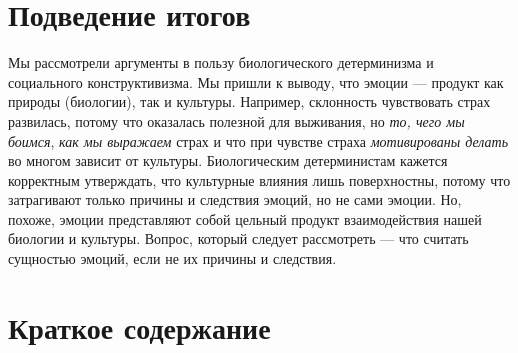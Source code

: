 \documentclass[11pt]{book}
\begin{document}
\section{Подведение итогов}

Мы рассмотрели аргументы в пользу биологического детерминизма и социального конструктивизма. Мы пришли к выводу, что эмоции --- продукт как природы (биологии), так и культуры. Например, склонность чувствовать страх развилась, потому что оказалась полезной для выживания, но \textit{то, чего мы боимся}, \textit{как мы выражаем} страх и что при чувстве страха \textit{мотивированы делать} во многом зависит от культуры. Биологическим детерминистам кажется корректным утверждать, что культурные влияния лишь поверхностны, потому что затрагивают только причины и следствия эмоций, но не сами эмоции. Но, похоже, эмоции представляют собой цельный продукт взаимодействия нашей биологии и культуры. Вопрос, который следует рассмотреть --- что считать сущностью эмоций, если не их причины и следствия.

\section{Краткое содержание}
\end{document}
